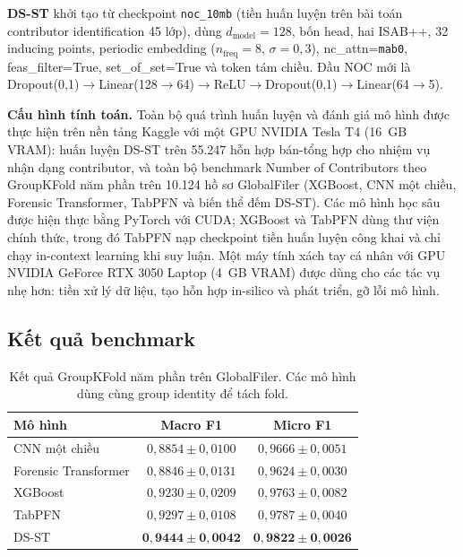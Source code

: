 \documentclass[12pt,a4paper]{article}
\begin{document}
\textbf{DS-ST} khởi tạo từ checkpoint \texttt{noc\_10mb} (tiền huấn luyện trên bài toán contributor identification 45 lớp), dùng $d_{\mathrm{model}}=128$, bốn head, hai ISAB++, 32 inducing points, periodic embedding ($n_{\mathrm{freq}}=8$, $\sigma=0{,}3$), nc\_attn=\texttt{mab0}, feas\_filter=True, set\_of\_set=True và token tám chiều. Đầu NOC mới là Dropout(0{,}1)$\to$Linear(128$\to$64)$\to$ReLU$\to$Dropout(0{,}1)$\to$Linear(64$\to$5).

\textbf{Cấu hình tính toán.} Toàn bộ quá trình huấn luyện và đánh giá mô hình được thực hiện trên nền tảng Kaggle với một GPU NVIDIA Tesla T4 (16~GB VRAM): huấn luyện DS-ST trên 55.247 hỗn hợp bán-tổng hợp cho nhiệm vụ nhận dạng contributor, và toàn bộ benchmark Number of Contributors theo GroupKFold năm phần trên 10.124 hồ sơ GlobalFiler (XGBoost, CNN một chiều, Forensic Transformer, TabPFN và biến thể đếm DS-ST). Các mô hình học sâu được hiện thực bằng PyTorch với CUDA; XGBoost và TabPFN dùng thư viện chính thức, trong đó TabPFN nạp checkpoint tiền huấn luyện công khai và chỉ chạy in-context learning khi suy luận. Một máy tính xách tay cá nhân với GPU NVIDIA GeForce RTX 3050 Laptop (4~GB VRAM) được dùng cho các tác vụ nhẹ hơn: tiền xử lý dữ liệu, tạo hỗn hợp in-silico và phát triển, gỡ lỗi mô hình.

\subsection{Kết quả benchmark}

\begin{table}[H]
\centering
\caption{Kết quả GroupKFold năm phần trên GlobalFiler. Các mô hình dùng cùng group identity để tách fold.}
\label{tab:benchmark}
\small
\begin{tabular}{lcc}
\toprule
\textbf{Mô hình} & \textbf{Macro F1} & \textbf{Micro F1} \\
\midrule
CNN một chiều & \(0,8854\pm0,0100\) & \(0,9666\pm0,0051\) \\
Forensic Transformer & \(0,8846\pm0,0131\) & \(0,9624\pm0,0030\) \\
XGBoost & \(0,9230\pm0,0209\) & \(0,9763\pm0,0082\) \\
TabPFN & \(0,9297\pm0,0108\) & \(0,9787\pm0,0040\) \\
DS-ST & \(\mathbf{0,9444\pm0,0042}\) & \(\mathbf{0,9822\pm0,0026}\) \\
\bottomrule
\end{tabular}
\end{table}
\end{document}
